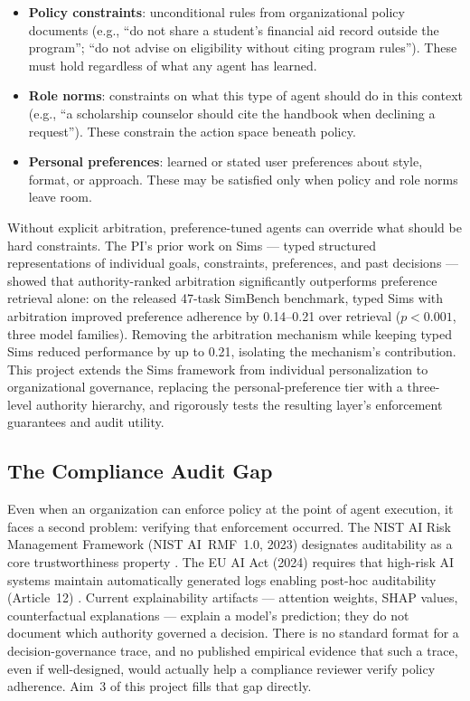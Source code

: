 \documentclass[11pt]{article}
\begin{document}
\begin{itemize}
  \item \textbf{Policy constraints}: unconditional rules from organizational policy documents (e.g., ``do not share a student's financial aid record outside the program''; ``do not advise on eligibility without citing program rules''). These must hold regardless of what any agent has learned.
  \item \textbf{Role norms}: constraints on what this type of agent should do in this context (e.g., ``a scholarship counselor should cite the handbook when declining a request''). These constrain the action space beneath policy.
  \item \textbf{Personal preferences}: learned or stated user preferences about style, format, or approach. These may be satisfied only when policy and role norms leave room.
\end{itemize}

Without explicit arbitration, preference-tuned agents can override what should be hard constraints. The PI's prior work on Sims --- typed structured representations of individual goals, constraints, preferences, and past decisions --- showed that authority-ranked arbitration significantly outperforms preference retrieval alone: on the released 47-task SimBench benchmark, typed Sims with arbitration improved preference adherence by 0.14--0.21 over retrieval ($p < 0.001$, three model families). Removing the arbitration mechanism while keeping typed Sims reduced performance by up to 0.21, isolating the mechanism's contribution. This project extends the Sims framework from individual personalization to organizational governance, replacing the personal-preference tier with a three-level authority hierarchy, and rigorously tests the resulting layer's enforcement guarantees and audit utility.

\subsection{The Compliance Audit Gap}

Even when an organization can enforce policy at the point of agent execution, it faces a second problem: verifying that enforcement occurred. The NIST AI Risk Management Framework (NIST AI~RMF~1.0, 2023) designates auditability as a core trustworthiness property \citep{nist2023rmf}. The EU AI Act (2024) requires that high-risk AI systems maintain automatically generated logs enabling post-hoc auditability (Article~12) \citep{euaiact2024}. Current explainability artifacts --- attention weights, SHAP values, counterfactual explanations --- explain a model's prediction; they do not document which authority governed a decision. There is no standard format for a decision-governance trace, and no published empirical evidence that such a trace, even if well-designed, would actually help a compliance reviewer verify policy adherence. Aim~3 of this project fills that gap directly.
\end{document}

